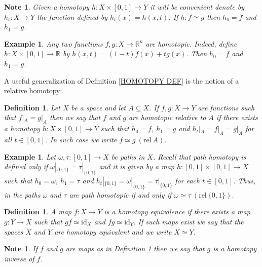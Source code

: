 \documentclass[11pt, letterpaper, oneside]{report}
\theoremstyle{pplain}
\theoremstyle{ddefinition}
\newtheorem{definition}[theorem]{Definition}
\newtheorem{example}[theorem]{Example}
\newtheorem{note}[theorem]{Note}
\theoremstyle{nnn}
\theoremstyle{eexercise}
\newcommand{\R}{{\mathbb R}}
\newcommand{\id}{\mathrm{id}}
\newcommand{\rel}{\mathrm{rel\ }}
\begin{document}

\begin{note}
Given a homotopy $h\colon X \times [0, 1] \to Y$ it will be convenient denote by $h_{t}\colon X \to Y$
the function defined by $h_{t}(x) = h(x, t)$. If $h\colon f\simeq g$ then $h_{0} = f$ and $h_{1} = g$. 
\end{note}


\begin{example}
\label{HOMOTTORN EX}
Any two functions $f, g\colon X \to \R^{n}$ are homotopic. Indeed, define 
$h\colon X \times [0, 1] \to \R$ by $h(x, t) = (1-t)f(x) + tg(x)$. Then $h_{0} = f$ and $h_{1} = g$. 
\end{example}

A useful generalization of Definition \ref{HOMOTOPY DEF} is the notion of a relative homotopy:

\begin{definition}
Let $X$ be a space and let $A\subseteq X$. If $f, g\colon X \to Y$ are functions such that $f|_{A} = g|_{A}$
then we say that $f$ and $g$ are \emph{homotopic relative to $A$} if there exists a homotopy 
$h\colon X \times [0, 1] \to Y$ such that $h_{0} = f$, $h_{1} = g$ and $h_{t}|_{A} = f|_{A} = g|_{A}$ for all 
$t\in [0, 1]$. In  such case we write $f\simeq g \ (\rel A)$. 
\end{definition}

\begin{example}
Let $\omega, \tau\colon [0, 1] \to X$ be paths in $X$. Recall that path homotopy is defined only 
if $\omega|_{\{0, 1\}} = \tau|_{\{0, 1\}}$  and it is given by a map $h\colon [0, 1]\times [0, 1] \to X$
such that $h_{0} = \omega$, $h_{1} = \tau$ and $h_{t}|_{\{0, 1\}} = \omega|_{\{0, 1\}} = \tau|_{\{0, 1\}}$
for each $t\in [0, 1]$.  Thus, in  the paths $\omega$ and $\tau$ are path homotopic if and only if 
$\omega \simeq \tau \ (\rel \{0, 1\})$. 
\end{example}

\begin{definition}
\label{HOMOTEQ DEF}
A map $f\colon X \to Y$ is a \emph{homotopy equivalence} if there exists a map $g\colon Y \to X$ 
such that $gf \simeq \id_{X}$ and $fg\simeq \id_{Y}$. If such maps exist  we say that the spaces
$X$ and $Y$ are \emph{homotopy equivalent} and we write $X \simeq Y$. 
\end{definition}

\begin{note}
If $f$ and $g$ are maps as in Definition \ref{HOMOTEQ DEF} then we say that $g$ is 
a \emph{homotopy inverse} of $f$.  
\end{note}
\end{document}
